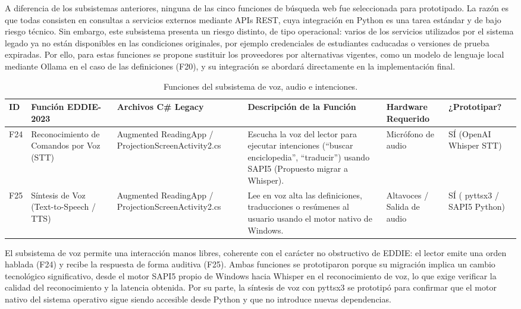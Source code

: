 A diferencia de los subsistemas anteriores, ninguna de las cinco funciones de búsqueda web fue seleccionada para prototipado. La razón es que todas consisten en consultas a servicios externos mediante APIs REST, cuya integración en Python es una tarea estándar y de bajo riesgo técnico. Sin embargo, este subsistema presenta un riesgo distinto, de tipo operacional: varios de los servicios utilizados por el sistema legado ya no están disponibles en las condiciones originales, por ejemplo credenciales de estudiantes caducadas o versiones de prueba expiradas. Por ello, para estas funciones se propone sustituir los proveedores por alternativas vigentes, como un modelo de lenguaje local mediante Ollama en el caso de las definiciones (F20), y su integración se abordará directamente en la implementación final.
 
\begin{table}[H]
    \centering
    \caption{Funciones del subsistema de voz, audio e intenciones.}
    \label{tab:func_voz_audio}
    \begin{small}
    \begin{tabular}{L{0.6cm} L{2.2cm} L{2.2cm} L{4.1cm} L{1.6cm} L{1.8cm}}
        \toprule
        ID & Función EDDIE-2023 & Archivos C\# Legacy & Descripción de la Función & Hardware Requerido & ¿Prototipar? \\ \midrule
        F24 & Reconocimiento de Comandos por Voz (STT) & Augmented ReadingApp / ProjectionScreenActivity2.cs & Escucha la voz del lector para ejecutar intenciones (``buscar enciclopedia'', ``traducir'') usando SAPI5 (Propuesto migrar a Whisper). & Micrófono de audio & SÍ (OpenAI Whisper STT) \\ \midrule
        F25 & Síntesis de Voz (Text-to-Speech / TTS) & Augmented ReadingApp / ProjectionScreenActivity2.cs & Lee en voz alta las definiciones, traducciones o resúmenes al usuario usando el motor nativo de Windows. & Altavoces / Salida de audio & SÍ ( pyttsx3 / SAPI5 Python) \\ \bottomrule
    \end{tabular}
    \end{small}
\end{table}
 
El subsistema de voz permite una interacción manos libres, coherente con el carácter no obstructivo de EDDIE: el lector emite una orden hablada (F24) y recibe la respuesta de forma auditiva (F25). Ambas funciones se prototiparon porque su migración implica un cambio tecnológico significativo, desde el motor SAPI5 propio de Windows hacia Whisper en el reconocimiento de voz, lo que exige verificar la calidad del reconocimiento y la latencia obtenida. Por su parte, la síntesis de voz con  pyttsx3 se prototipó para confirmar que el motor nativo del sistema operativo sigue siendo accesible desde Python y que no introduce nuevas dependencias.
 

